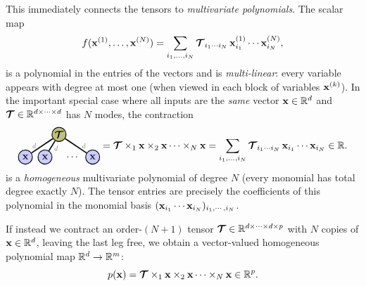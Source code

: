 \vspace{0.2cm}
\noindent
This immediately connects the tensors to \emph{multivariate polynomials}. The scalar map
\[
f(\mathbf{x}^{(1)},\dots,\mathbf{x}^{(N)})=\sum_{i_1,\dots,i_N}\bm{\mathcal{T}}_{i_1\cdots i_N}\,\mathbf{x}^{(1)}_{i_1}\cdots \mathbf{x}^{(N)}_{i_N},
\]
is a polynomial in the entries of the vectors and is \emph{multi-linear}: every variable appears with degree at most one (when viewed in each block of variables $\mathbf{x}^{(k)}$). In the important special case where all inputs are the \emph{same} vector $\mathbf{x}\in\mathbb{R}^{d}$ and $\bm{\mathcal{T}}\in\mathbb{R}^{d\times\cdots\times d}$ has $N$ modes, the  contraction
\[
\begin{tikzpicture}[baseline=2ex]
    \tikzset{tensor/.style = {minimum size = 0.5cm,shape = circle,thick,draw=black,inner sep = 0pt},
             edge/.style   = {thick,line width=.4mm},
             every loop/.style={}}
    \def\x{0}\def\y{0}

    \node[tensor,fill=green!50!red!50!white] (T) at (\x,\y+0.8){$\Tt$};

    \node[tensor,fill=blue!20!white] (a) at (\x-1.2,\y){$\xb$};
    \node[tensor,fill=blue!20!white] (b) at (\x-0.5,\y){$\xb$};
    \node[draw=none] (dots) at (\x+0.5,\y){$\cdots$};
    \node[tensor,fill=blue!20!white] (z) at (\x+1.2,\y){$\xb$};

    \draw[edge] (T) -- (a) node [midway,left]{\scalebox{0.7}{\dimcolor{$d\ $}}};
    \draw[edge] (T) -- (b) node [near end,right]{\scalebox{0.7}{\dimcolor{$d$}}};
    \draw[edge] (T) -- (z) node [midway,right]{\scalebox{0.7}{\dimcolor{$\ d$}}};
\end{tikzpicture}
= \Tt \ttm{1}\xb \ttm{2}\xb \cdots \ttm{N}\xb
=
\sum_{i_1,\dots,i_N}\Tt_{i_1\cdots i_N}\,\xb_{i_1}\cdots \xb_{i_N} \in \RR.
\]
is a \emph{homogeneous} multivariate polynomial of degree $N$ (every monomial has total degree exactly $N$). The tensor entries are precisely the coefficients of this polynomial in the monomial basis $(\mathbf{x}_{i_1}\cdots \mathbf{x}_{i_N})_{i_1,\cdots,i_N}$.

If instead we contract an order-$(N+1)$ tensor $\bm{\mathcal{T}}\in\mathbb{R}^{ d\times\cdots\times d \times p}$ with $N$ copies of $\mathbf{x}\in\mathbb{R}^d$, leaving the last leg free, we obtain a vector-valued homogeneous polynomial map $\mathbb{R}^d\to\mathbb{R}^m$:
\[
p(\mathbf{x}) = \bm{\mathcal{T}} \times_{1}\mathbf{x} \times_{2}\mathbf{x}\cdots \times_{N}\mathbf{x} \in\mathbb{R}^{p}.
\]

